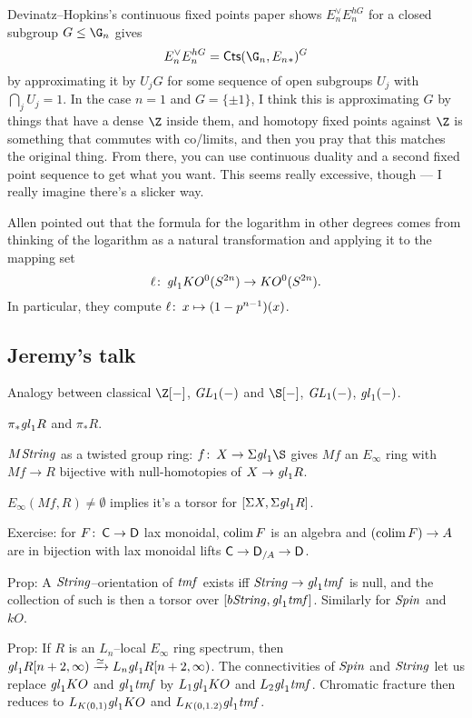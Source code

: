Devinatz--Hopkins's continuous fixed points paper shows $E_n^\vee E_n^{hG}$ for a closed subgroup $G \le \G_n$ gives \[E_n^\vee E_n^{hG} = \CatOf{Cts}(\G_n, E_n{}_*)^G\] by approximating it by $U_j G$ for some sequence of open subgroups $U_j$ with $\bigcap_j U_j = 1$.  In the case $n = 1$ and $G = \{\pm 1\}$, I think this is approximating $G$ by things that have a dense $\Z$ inside them, and homotopy fixed points against $\Z$ is something that commutes with co/limits, and then you pray that this matches the original thing.  From there, you can use continuous duality and a second fixed point sequence to get what you want.  This seems really excessive, though --- I really imagine there's a slicker way.







Allen pointed out that the formula for the logarithm in other degrees comes from thinking of the logarithm as a natural transformation and applying it to the mapping set \[\ell\colon\thinspace \mathit{gl}_1 KO^0(S^{2n}) \to KO^0(S^{2n}).\]  In particular, they compute $\ell\colon\thinspace x \mapsto (1 - p^{n-1})(x)$.





\subsection{Jeremy's talk}

Analogy between classical $\Z[-]$, $\mathit{GL}_1(-)$ and $\S[-]$, $\mathit{GL}_1(-)$, $\mathit{gl}_1(-)$.

$\pi_* \mathit{gl}_1 R$ and $\pi_* R$.

$M\mathit{String}$ as a twisted group ring: $f\co X \to \Susp \gl_1 \S$ gives $Mf$ an $E_\infty$ ring with $Mf \to R$ bijective with null-homotopies of $X \to \mathit{gl}_1 R$.

$E_\infty(Mf, R) \ne \emptyset$ implies it's a torsor for $[\Sigma X, \Sigma \mathit{gl}_1 R]$.

Exercise: for $F\colon\thinspace \mathsf{C} \to \mathsf{D}$ lax monoidal, $\operatorname*{colim} F$ is an algebra and $(\operatorname*{colim} F) \to A$ are in bijection with lax monoidal lifts $\mathsf{C} \to \mathsf{D}_{/A} \to \mathsf{D}$.

Prop: A $\mathit{String}$--orientation of $\mathit{tmf}$ exists iff $\mathit{String} \to \mathit{gl}_1 \mathit{tmf}$ is null, and the collection of such is then a torsor over $[b\mathit{String}, \mathit{gl}_1 \mathit{tmf}]$.  Similarly for $\mathit{Spin}$ and $kO$.

Prop: If $R$ is an $L_n$--local $E_\infty$ ring spectrum, then $\mathit{gl}_1 R[n+2, \infty) \xrightarrow{\simeq} L_n \mathit{gl}_1 R[n+2, \infty)$.  The connectivities of $\mathit{Spin}$ and $\mathit{String}$ let us replace $\mathit{gl}_1 KO$ and $\mathit{gl}_1 \mathit{tmf}$ by $L_1 \mathit{gl}_1 KO$ and $L_2 \mathit{gl}_1 \mathit{tmf}$.  Chromatic fracture then reduces to $L_{K(0, 1)} \mathit{gl}_1 KO$ and $L_{K(0, 1. 2)} \mathit{gl}_1 \mathit{tmf}$.

